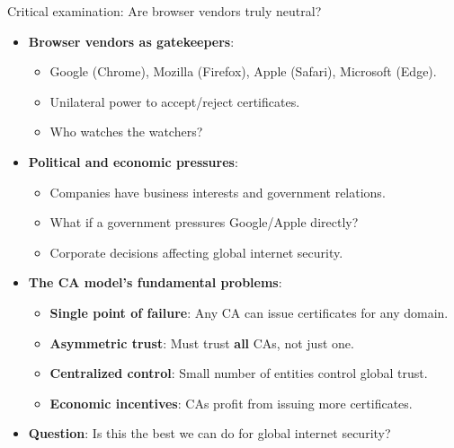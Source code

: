 \documentclass[aspectratio=169, lualatex, handout]{beamer}
\begin{document}
\begin{frame}{Critical examination: Are browser vendors truly neutral?}
	\begin{itemize}
		\item \textbf{Browser vendors as gatekeepers}:
		      \begin{itemize}
			      \item Google (Chrome), Mozilla (Firefox), Apple (Safari), Microsoft (Edge).
			      \item Unilateral power to accept/reject certificates.
			      \item Who watches the watchers?
		      \end{itemize}
		\item \textbf{Political and economic pressures}:
		      \begin{itemize}
			      \item Companies have business interests and government relations.
			      \item What if a government pressures Google/Apple directly?
			      \item Corporate decisions affecting global internet security.
		      \end{itemize}
		\item \textbf{The CA model's fundamental problems}:
		      \begin{itemize}
			      \item \textbf{Single point of failure}: Any CA can issue certificates for any domain.
			      \item \textbf{Asymmetric trust}: Must trust \textbf{all} CAs, not just one.
			      \item \textbf{Centralized control}: Small number of entities control global trust.
			      \item \textbf{Economic incentives}: CAs profit from issuing more certificates.
		      \end{itemize}
		\item \textbf{Question}: Is this the best we can do for global internet security?
	\end{itemize}
\end{frame}
\end{document}
